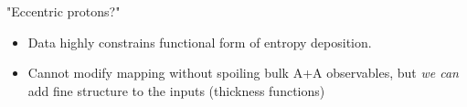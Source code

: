 \documentclass{beamer}
\begin{document}
\begin{frame}{"Eccentric protons?" \quad {\scriptsize \textcolor{offblack}{Schenke, Venugopalan PRL 113 102301}}}
  \small
  \begin{itemize}
    \item Data highly constrains functional form of entropy deposition.\\[1ex]
    \item Cannot modify mapping without spoiling bulk A+A observables, but \emph{we can} add
          fine structure to the inputs (thickness functions)\\[2ex]
  \end{itemize}
  \centering
   \\[2ex]

\end{frame}
\end{document}
